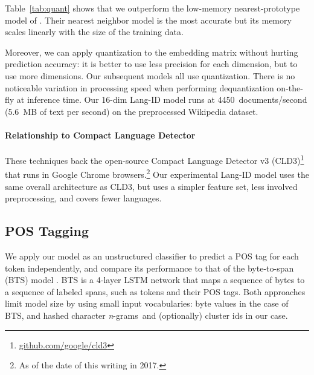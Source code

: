 \documentclass[11pt,letterpaper]{article}
\newcommand{\kgrams}[1]{{\it #1}-grams}
\newcommand{\ngrams}{\kgrams{n}}
\begin{document}
Table~\ref{tab:quant} shows that
we outperform the low-memory nearest-prototype model of .
Their nearest neighbor model is the most accurate but its memory scales linearly with the size of the training data.

Moreover, we can apply quantization to the embedding matrix without hurting prediction accuracy:
it is better to use less precision for each dimension, but to use more dimensions.
Our subsequent models all use quantization.
There is no noticeable variation in processing speed when performing dequantization on-the-fly at inference time.
Our 16-dim Lang-ID model runs at 4450~documents/second (5.6~MB of text per second) on the preprocessed Wikipedia dataset.

\paragraph{Relationship to Compact Language Detector}
  These techniques back the open-source Compact Language Detector v3 (CLD3)\footnote{\url{github.com/google/cld3}}
  that runs in Google Chrome browsers.\footnote{As of the date of this writing in 2017.}
Our experimental Lang-ID model uses the same overall architecture as CLD3, but uses a simpler feature set, less involved preprocessing, and covers fewer languages.

\begin{table}[t]
  \caption{Language Identification.  Quantization allows trading numerical precision for larger embeddings.  The two models from  are the nearest neighbor (NN) and nearest prototype (NP) approaches.}
\label{tab:quant}
\end{table}

\subsection{POS Tagging}
We apply our model as an unstructured classifier to predict a POS tag for each token independently,
and compare its performance to that of the byte-to-span (BTS) model \cite{gillick2016brnn}.
BTS is a 4-layer LSTM network that maps a sequence of bytes to a sequence of labeled spans, such as tokens and their POS tags.
Both approaches limit  model size by using small input vocabularies: byte values in the case of BTS, and 
hashed character \ngrams \ and (optionally) cluster ids in our case.
\end{document}
